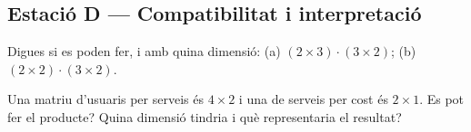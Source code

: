 \subsection{Estació D — Compatibilitat i interpretació}

\begin{exercicis}[Estació D]
\begin{exlist}
  \item Digues si es poden fer, i amb quina dimensió: (a) $(2\times 3)\cdot(3\times 2)$;
        \;(b) $(2\times 2)\cdot(3\times 2)$.
  \item Una matriu d'usuaris per serveis és $4\times 2$ i una de serveis per cost
        és $2\times 1$. Es pot fer el producte? Quina dimensió tindria i què
        representaria el resultat?
\end{exlist}
\end{exercicis}

